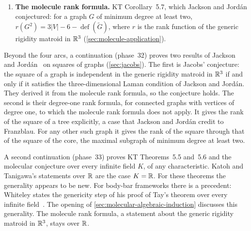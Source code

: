 \begin{enumerate}
{        equivalence.} Projective invariance of infinitesimal rigidity
        (Crapo and Whiteley), under a polarity that turns molecular
        frameworks into panel-hinge frameworks, and Whiteley's equivalence
        between molecular frameworks on a graph $G$ and bar-joint frameworks
        on its square $G^2$, both as equalities of dimensions of motion
        spaces (\cref{sec:molecule-modelling}).
  \item \textbf{The molecule rank formula.} KT Corollary~5.7, which
        Jackson and Jord\'an conjectured: for a graph $G$ of minimum degree
        at least two, $r(G^2) = 3|V| - 6 - \operatorname{def}(\tilde G)$,
        where $r$ is the rank function of the generic rigidity matroid in
        ${\mathbb{R}}^3$ (\cref{sec:molecule-application}).
\end{enumerate}

Beyond the four arcs, a continuation (phase~32) proves two results of
Jackson and Jord\'an~\cite{jacksonJordan2008} on squares of graphs
(\cref{sec:jacobs}). The first is Jacobs' conjecture: the square of a
graph is independent in the generic rigidity matroid in ${\mathbb{R}}^3$ if and
only if it satisfies the three-dimensional Laman condition of Jackson and
Jord\'an. They derived it from the molecule rank formula, so the
conjecture holds. The second is their degree-one rank formula, for
connected graphs with vertices of degree one, to which the molecule rank
formula does not apply. It gives the rank of the square of a tree
explicitly, a case that Jackson and Jord\'an credit to Franzblau. For
any other such graph it gives the rank of the square through that of the
square of the core, the maximal subgraph of minimum degree at least two.

A second continuation (phase~33) proves KT Theorems~5.5 and~5.6 and the
molecular conjecture over every infinite field $K$, of any
characteristic. Katoh and Tanigawa's statements over ${\mathbb{R}}$ are the case
$K = {\mathbb{R}}$. For these theorems the generality appears to be new. For
body-bar frameworks there is a precedent: Whiteley states the genericity
step of his proof of Tay's theorem over every infinite
field~\cite{whiteley1988}. The opening of
\cref{sec:molecular-algebraic-induction} discusses this generality. The
molecule rank formula, a statement about the generic rigidity matroid in
${\mathbb{R}}^3$, stays over ${\mathbb{R}}$.

